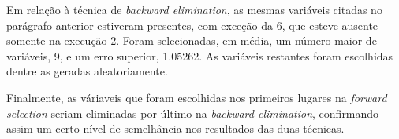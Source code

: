 \begin{enumerate}
\begin{enumerate}
		     \vspace{12pt}
		     
		     Em relação à técnica de \textit{backward elimination}, as mesmas
		     variáveis citadas no parágrafo anterior estiveram presentes, com exceção
		     da 6, que esteve ausente somente na execução 2. Foram selecionadas, em
		     média, um número maior de variáveis, 9, e um erro superior, 1.05262. As
		     variáveis restantes foram escolhidas dentre as geradas aleatoriamente.
		     
		     \vspace{12pt}
		     
		     Finalmente, as váriaveis que foram escolhidas nos primeiros lugares na
		     \textit{forward selection} seriam eliminadas por último na
		     \textit{backward elimination}, confirmando assim um certo nível de
		     semelhância nos resultados das duas técnicas.
		     
		\end{enumerate}
\end{enumerate}
		  
